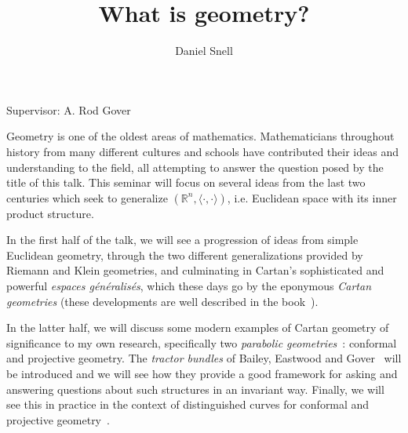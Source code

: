 \documentclass{article}[11]
\title{What is geometry?}
\author{Daniel Snell}
\date{}
\newcommand{\RR}{\mathbb{R}}
\begin{document}
\maketitle

\vspace{-2.5em}
\begin{center}
	Supervisor: A. Rod Gover
\end{center}

Geometry is one of the oldest areas of mathematics.
Mathematicians throughout history from many different cultures and schools have contributed their ideas and understanding to the field, all attempting to answer the question posed by the title of this talk.
This seminar will focus on several ideas from the last two centuries which seek to generalize $\left(\RR^n, \langle \cdot , \cdot \rangle\right)$, i.e. Euclidean space with its inner product structure.

In the first half of the talk, we will see a progression of ideas from simple Euclidean geometry, through the two different generalizations provided by Riemann and Klein geometries, and culminating in Cartan's sophisticated and powerful \emph{espaces g\'{e}n\'{e}ralis\'{e}s}, which these days go by the eponymous \emph{Cartan geometries} (these developments are well described in the book~\cite{Sharpe}).

In the latter half, we will discuss some modern examples of Cartan geometry of significance to my own research, specifically two \emph{parabolic geometries}~\cite{CS-book}: conformal and projective geometry.
The \emph{tractor bundles} of Bailey, Eastwood and Gover~\cite{BEG} will be introduced and we will see how they provide a good framework for asking and answering questions about such structures in an invariant way.
Finally, we will see this in practice in the context of distinguished curves for conformal and projective geometry~\cite{GST}.



\end{document}
